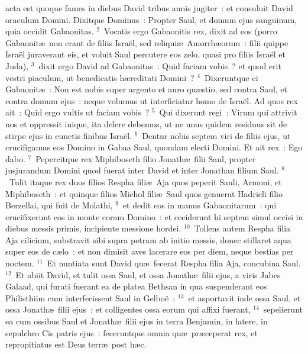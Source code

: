 \bchapter
{}acta est quoque fames in diebus David tribus annis jugiter~: et consuluit David oraculum Domini. Dixitque Dominus~: Propter Saul, et domum ejus sanguinum, quia occidit Gabaonitas.
${}^{2}$~Vocatis ergo Gabaonitis rex, dixit ad eos (porro Gabaonit\ae\ non erant de filiis Isra\"el, sed reliqui\ae\ Amorrh\ae orum~: filii quippe Isra\"el juraverant eis, et voluit Saul percutere eos zelo, quasi pro filiis Isra\"el et Juda),
${}^{3}$~dixit ergo David ad Gabaonitas~: Quid faciam vobis~? et quod erit vestri piaculum, ut benedicatis h\ae reditati Domini~?
${}^{4}$~Dixeruntque ei Gabaonit\ae~: Non est nobis super argento et auro qu\ae stio, sed contra Saul, et contra domum ejus~: neque volumus ut interficiatur homo de Isra\"el. Ad quos rex ait~: Quid ergo vultis ut faciam vobis~?
${}^{5}$~Qui dixerunt regi~: Virum qui attrivit nos et oppressit inique, ita delere debemus, ut ne unus quidem residuus sit de stirpe ejus in cunctis finibus Isra\"el.
${}^{6}$~Dentur nobis septem viri de filiis ejus, ut crucifigamus eos Domino in Gabaa Saul, quondam electi Domini. Et ait rex~: Ego dabo.
${}^{7}$~Pepercitque rex Miphiboseth filio Jonath\ae\ filii Saul, propter jusjurandum Domini quod fuerat inter David et inter Jonathan filium Saul.
${}^{8}$~Tulit itaque rex duos filios Respha fili\ae\ Aja quos peperit Sauli, Armoni, et Miphiboseth~: et quinque filios Michol fili\ae\ Saul quos genuerat Hadrieli filio Berzellai, qui fuit de Molathi,
${}^{9}$~et dedit eos in manus Gabaonitarum~: qui crucifixerunt eos in monte coram Domino~: et ceciderunt hi septem simul occisi in diebus messis primis, incipiente messione hordei.
${}^{10}$~Tollens autem Respha filia Aja cilicium, substravit sibi supra petram ab initio messis, donec stillaret aqua super eos de c\ae lo~: et non dimisit aves lacerare eos per diem, neque bestias per noctem.
${}^{11}$~Et nuntiata sunt David qu\ae\ fecerat Respha filia Aja, concubina Saul.
${}^{12}$~Et abiit David, et tulit ossa Saul, et ossa Jonath\ae\ filii ejus, a viris Jabes Galaad, qui furati fuerant ea de platea Bethsan in qua suspenderant eos Philisthiim cum interfecissent Saul in Gelbo\"e~:
${}^{13}$~et asportavit inde ossa Saul, et ossa Jonath\ae\ filii ejus~: et colligentes ossa eorum qui affixi fuerant,
${}^{14}$~sepelierunt ea cum ossibus Saul et Jonath\ae\ filii ejus in terra Benjamin, in latere, in sepulchro Cis patris ejus~: feceruntque omnia qu\ae\ pr\ae ceperat rex, et repropitiatus est Deus terr\ae\ post h\ae c.


